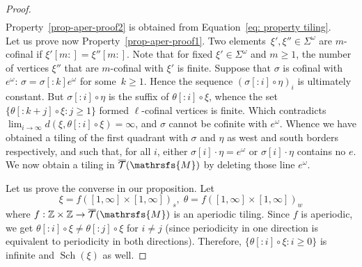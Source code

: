 \documentclass{amsart}
\begin{document}
{\begin{proof}
\begin{align*}
\end{align*}
Property~\ref{prop-aper-proof2} is obtained from Equation~\eqref{eq: property tiling}. \\
Let us prove now Property~\ref{prop-aper-proof1}. Two elements~$\xi', \xi''\in {{{\Sigma}}}^{\omega}$ are $m$-cofinal if $\xi'[m:]=\xi''[m:]$. Note that for fixed $\xi'\in {{{\Sigma}}}^{\omega}$ and $m\ge 1$, the number of vertices $\xi''$ that are $m$-cofinal with
\(\xi'\) is finite. Suppose that $\sigma$ is  cofinal with~$e^{\omega}$: $\sigma=\sigma[:k]e^{\omega}$ for some~$k\ge 1$. Hence  the sequence $(\sigma[:i]{{{\circ}}} \eta)_i$ is ultimately constant. But $\sigma[:i]{{{\circ}}} \eta$ is the suffix of  $ \theta[:i] {{{\circ}}} \xi$, whence the set $\{ \theta[:k+j] {{{\circ}}} \xi: j\ge 1\}$  formed  $\ell$-cofinal vertices is finite. Which contradicts $\lim_{i\rightarrow \infty}d(\xi,  \theta[:i] {{{\circ}}} \xi)=\infty$, and $\sigma$ cannot be cofinite with $e^\omega$. Whence we have obtained a tiling of the first quadrant with $\sigma$ and $\eta$ as west and south borders respectively, and such that, for all $i$, either $\sigma[i] {{{\cdot}}} \eta  = e^\omega$ or $\sigma[i] {{{\cdot}}} \eta$ contains no $e$. We now obtain a tiling in $\overline{\mathcal{T}}({{{\mathrsfs{{M}}}}})$  by deleting those line $e^\omega$.\medskip

Let us prove the converse in our proposition. Let 
$$
\xi=f\left([1,\infty]\times [1,\infty]\right)_{s}, \;\theta=f\left([1,\infty]\times [1,\infty]\right)_{w}
$$
where $f: \mathbb{Z}\times\mathbb{Z}\rightarrow \overline{\mathcal{T}}({{{\mathrsfs{{M}}}}})$ is an aperiodic tiling. Since $f$ is aperiodic, we get $\theta[:i]{{{\circ}}} \xi\neq \theta[:j]{{{\circ}}} \xi$ for $i\neq j$ (since periodicity in one direction is equivalent to periodicity in both directions).  Therefore, $\{\theta[:i]{{{\circ}}} \xi: i\ge 0 \}$ is infinite and $\operatorname{Sch}(\xi)$ as well. 
 

\end{proof}

}
\end{document}
